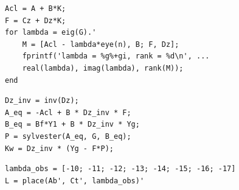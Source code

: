 \documentclass[a4paper,12pt]{article}
\begin{document}
\begin{lstlisting}[caption={Проверка условий существования решения уравнений Франкиса--Дэвисона}, label={lst:check_fd}]
Acl = A + B*K;
F = Cz + Dz*K;
for lambda = eig(G).'
	M = [Acl - lambda*eye(n), B; F, Dz];
	fprintf('lambda = %g%+gi, rank = %d\n', ...
	real(lambda), imag(lambda), rank(M));
end
\end{lstlisting}

\begin{lstlisting}[caption={Синтез матрицы \(K_w\)}, label={lst:kw_synthesis}]
Dz_inv = inv(Dz); 
A_eq = -Acl + B * Dz_inv * F;
B_eq = Bf*Y1 + B * Dz_inv * Yg;
P = sylvester(A_eq, G, B_eq);
Kw = Dz_inv * (Yg - F*P);
\end{lstlisting}
	
\begin{lstlisting}[caption={Синтез матрицы \(L\)}, label={lst:L2}]
lambda_obs = [-10; -11; -12; -13; -14; -15; -16; -17]
L = place(Ab', Ct', lambda_obs)'
\end{lstlisting}
	
	
	

	
\end{document}
